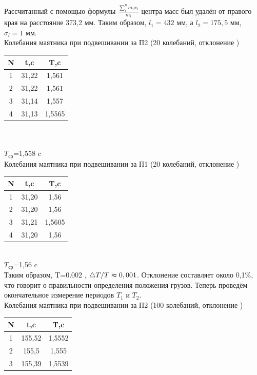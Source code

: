 \documentclass[12pt]{article}
\begin{document}
Рассчитанный с помощью формулы \Large $\frac{\sum_{i}^n m_{i}x_{i}}{m_{i}}$ \normalsize центра масс был удалён от правого края на расстояние 373,2 мм. Таким образом, $l_{1}=432$ мм, а $l_{2}=175,5$ мм, $\sigma_{l}=1$ мм.\\

Колебания маятника при подвешивании за П2 (20 колебаний, отклонение \degree)\\

\begin{tabular}{c|c|c}
N & t,c & T,c\\
\hline
 1 & 31,22 & 1,561\\
 2 & 31,22 & 1,561\\
 3 & 31,14 & 1,557\\
 4 & 31,13 & 1,5565\\
\end{tabular}\\
\\

$T_{\text{ср}}$=1,558 c\\


Колебания маятника при подвешивании за П1 (20 колебаний, отклонение \degree)\\

\begin{tabular}{c|c|c}
N & t,c & T,c\\
\hline
 1 & 31,20 & 1,56\\
 2 & 31,20 & 1,56\\
 3 & 31,21 & 1,5605\\
 4 & 31,20 & 1,56\\
\end{tabular}\\

$T_{\text{ср}}$=1,56 c\\

Таким образом, \triangle T=0.002 ,\; $\triangle T/T \thickapprox 0,001 $. Отклонение составляет около 0,1\%, что говорит о правильности определения положения грузов. Теперь проведём окончательное измерение периодов $T_{1}$ и $T_{2}$.\\

Колебания маятника при подвешивании за П2 (100 колебаний, отклонение \degree)\\

\begin{tabular}{c|c|c}
N & t,c & T,c\\
\hline
 1 & 155,52 & 1,5552\\
 2 & 155,5 & 1,555\\
 3 & 155,39 & 1,5539\\
\end{tabular}\\
\end{document}
